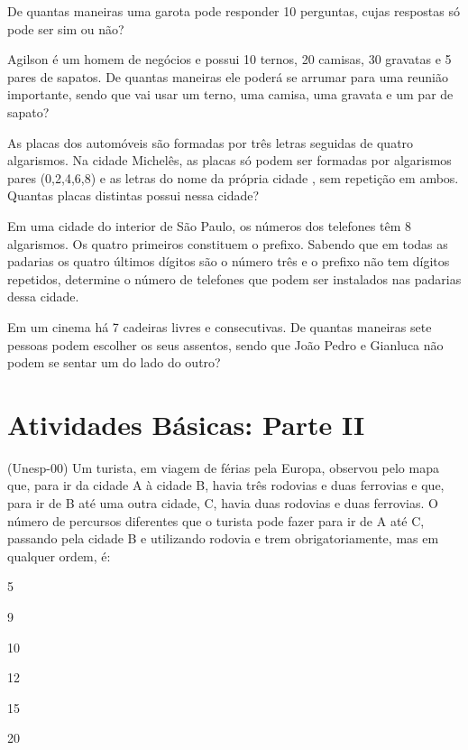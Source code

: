 	\item De quantas maneiras uma garota pode responder 10 perguntas, cujas respostas só pode ser sim ou não?
	
	\item Agilson é um homem de negócios e possui 10 ternos, 20 camisas, 30 gravatas e 5 pares de sapatos. De quantas maneiras ele poderá se arrumar para uma reunião importante, sendo que vai usar um terno, uma camisa, uma gravata e um par de sapato?	
	
	
	\item As placas dos automóveis são formadas por três letras seguidas de quatro algarismos. Na cidade Michelês, as placas só podem ser formadas por algarismos pares (0,2,4,6,8) e as letras do nome da própria cidade , sem repetição em ambos. Quantas placas distintas possui nessa cidade?
	
	\item Em uma cidade do interior de São Paulo, os números dos telefones têm 8 algarismos. Os quatro primeiros constituem o prefixo. Sabendo que em todas as padarias os quatro últimos dígitos são o número três e o prefixo não tem dígitos repetidos, determine o número de telefones que podem ser instalados nas padarias dessa cidade.
	
	\item Em um cinema há 7 cadeiras livres e consecutivas. De quantas maneiras sete pessoas podem escolher os seus assentos, sendo que João Pedro e Gianluca não podem se sentar um do lado do outro?
	
	

\section{Atividades Básicas: Parte II}				
		
	
	\item (Unesp-00) Um turista, em viagem de férias pela Europa, observou pelo mapa que, para ir da cidade A à cidade B, havia três rodovias e duas ferrovias e que, para ir de B até uma outra cidade, C, havia duas rodovias e duas ferrovias. O número de percursos diferentes que o turista pode fazer para ir de A até C, passando pela cidade B e utilizando rodovia e trem obrigatoriamente, mas em qualquer ordem, é:
	\begin{enumerate}
	\end{enumerate}
 
